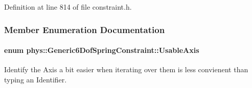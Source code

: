 Definition at line 814 of file constraint.h.



\subsubsection{Member Enumeration Documentation}
\hypertarget{classphys_1_1Generic6DofSpringConstraint_a525a9ce88c6160c44be748fe45833f60}{
\paragraph[{UsableAxis}]{\setlength{\rightskip}{0pt plus 5cm}enum {\bf phys::Generic6DofSpringConstraint::UsableAxis}}\hfill}
\label{classphys_1_1Generic6DofSpringConstraint_a525a9ce88c6160c44be748fe45833f60}


Identify the Axis a bit easier when iterating over them is less convienent than typing an Identifier. 

